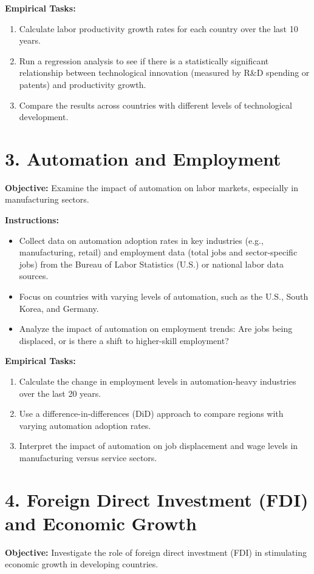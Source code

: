 \documentclass{article}
\begin{document}
\textbf{Empirical Tasks:}
\begin{enumerate}
    \item Calculate labor productivity growth rates for each country over the last 10 years.
    \item Run a regression analysis to see if there is a statistically significant relationship between technological innovation (measured by R\&D spending or patents) and productivity growth.
    \item Compare the results across countries with different levels of technological development.
\end{enumerate}

\section*{3. Automation and Employment}
\textbf{Objective:} Examine the impact of automation on labor markets, especially in manufacturing sectors.

\textbf{Instructions:}
\begin{itemize}
    \item Collect data on automation adoption rates in key industries (e.g., manufacturing, retail) and employment data (total jobs and sector-specific jobs) from the Bureau of Labor Statistics (U.S.) or national labor data sources.
    \item Focus on countries with varying levels of automation, such as the U.S., South Korea, and Germany.
    \item Analyze the impact of automation on employment trends: Are jobs being displaced, or is there a shift to higher-skill employment?
\end{itemize}

\textbf{Empirical Tasks:}
\begin{enumerate}
    \item Calculate the change in employment levels in automation-heavy industries over the last 20 years.
    \item Use a difference-in-differences (DiD) approach to compare regions with varying automation adoption rates.
    \item Interpret the impact of automation on job displacement and wage levels in manufacturing versus service sectors.
\end{enumerate}

\section*{4. Foreign Direct Investment (FDI) and Economic Growth}
\textbf{Objective:} Investigate the role of foreign direct investment (FDI) in stimulating economic growth in developing countries.
\end{document}
